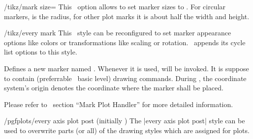 \begin{key}{/tikz/mark size=}
	This \Tikz\ option allows to set marker sizes to . For circular markers,  is the radius, for other plot marks it is about half the width and height.
\end{key}
\begin{key}{/tikz/every mark}
	This \Tikz\ style can be reconfigured to set marker appearance options like colors or transformations like scaling or rotation. \PGFPlots\ appends its cycle list options to this style.
\begin{codeexample}[]
\end{codeexample}

\begin{codeexample}[]
\end{codeexample}
\end{key}

\begin{command}{\pgfdeclareplotmark{}}
	Defines a new marker named . Whenever it is used,  will be invoked. It is suppose to contain (preferrable \PGF\ basic level) drawing commands. During , the coordinate system's origin denotes the coordinate where the marker shall be placed.

	Please refer to~\cite{tikz} section ``Mark Plot Handler'' for more detailed information.
\end{command}



\begin{stylekey}{/pgfplots/every axis plot post (initially {})}
The |every axis plot post| style can be used to overwrite parts (or all) of the drawing styles which are assigned for plots.
\begin{codeexample}[]
\end{codeexample}
\end{stylekey}

